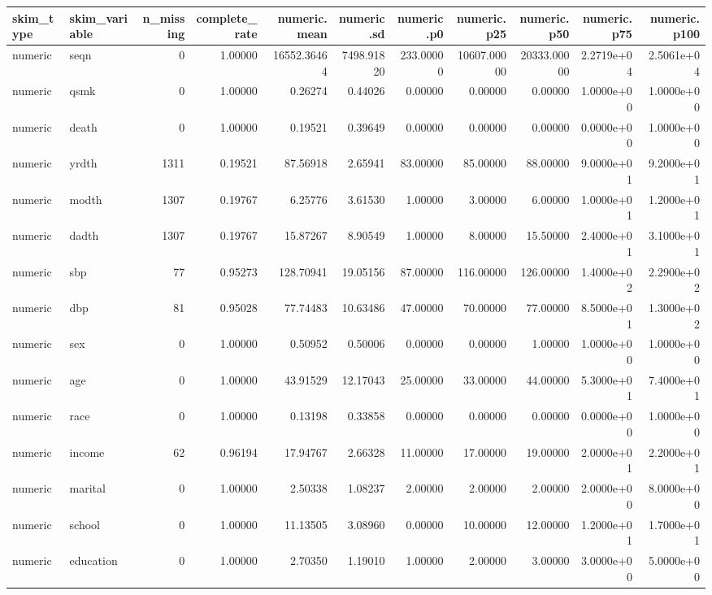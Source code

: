 \documentclass[12pt, krantz2,]{krantz}
\theoremstyle{definition}
\theoremstyle{definition}
\theoremstyle{definition}
\newcommand{\1}{\mathbbm{1}}
\begin{document}
\begin{tabular}{l|l|r|r|r|r|r|r|r|r|r}
\hline
skim\_type & skim\_variable & n\_missing & complete\_rate & numeric.mean & numeric.sd & numeric.p0 & numeric.p25 & numeric.p50 & numeric.p75 & numeric.p100\\
\hline
numeric & seqn & 0 & 1.00000 & 16552.36464 & 7498.91820 & 233.00000 & 10607.00000 & 20333.00000 & 2.2719e+04 & 2.5061e+04\\
\hline
numeric & qsmk & 0 & 1.00000 & 0.26274 & 0.44026 & 0.00000 & 0.00000 & 0.00000 & 1.0000e+00 & 1.0000e+00\\
\hline
numeric & death & 0 & 1.00000 & 0.19521 & 0.39649 & 0.00000 & 0.00000 & 0.00000 & 0.0000e+00 & 1.0000e+00\\
\hline
numeric & yrdth & 1311 & 0.19521 & 87.56918 & 2.65941 & 83.00000 & 85.00000 & 88.00000 & 9.0000e+01 & 9.2000e+01\\
\hline
numeric & modth & 1307 & 0.19767 & 6.25776 & 3.61530 & 1.00000 & 3.00000 & 6.00000 & 1.0000e+01 & 1.2000e+01\\
\hline
numeric & dadth & 1307 & 0.19767 & 15.87267 & 8.90549 & 1.00000 & 8.00000 & 15.50000 & 2.4000e+01 & 3.1000e+01\\
\hline
numeric & sbp & 77 & 0.95273 & 128.70941 & 19.05156 & 87.00000 & 116.00000 & 126.00000 & 1.4000e+02 & 2.2900e+02\\
\hline
numeric & dbp & 81 & 0.95028 & 77.74483 & 10.63486 & 47.00000 & 70.00000 & 77.00000 & 8.5000e+01 & 1.3000e+02\\
\hline
numeric & sex & 0 & 1.00000 & 0.50952 & 0.50006 & 0.00000 & 0.00000 & 1.00000 & 1.0000e+00 & 1.0000e+00\\
\hline
numeric & age & 0 & 1.00000 & 43.91529 & 12.17043 & 25.00000 & 33.00000 & 44.00000 & 5.3000e+01 & 7.4000e+01\\
\hline
numeric & race & 0 & 1.00000 & 0.13198 & 0.33858 & 0.00000 & 0.00000 & 0.00000 & 0.0000e+00 & 1.0000e+00\\
\hline
numeric & income & 62 & 0.96194 & 17.94767 & 2.66328 & 11.00000 & 17.00000 & 19.00000 & 2.0000e+01 & 2.2000e+01\\
\hline
numeric & marital & 0 & 1.00000 & 2.50338 & 1.08237 & 2.00000 & 2.00000 & 2.00000 & 2.0000e+00 & 8.0000e+00\\
\hline
numeric & school & 0 & 1.00000 & 11.13505 & 3.08960 & 0.00000 & 10.00000 & 12.00000 & 1.2000e+01 & 1.7000e+01\\
\hline
numeric & education & 0 & 1.00000 & 2.70350 & 1.19010 & 1.00000 & 2.00000 & 3.00000 & 3.0000e+00 & 5.0000e+00\\

\end{tabular}
\end{document}
